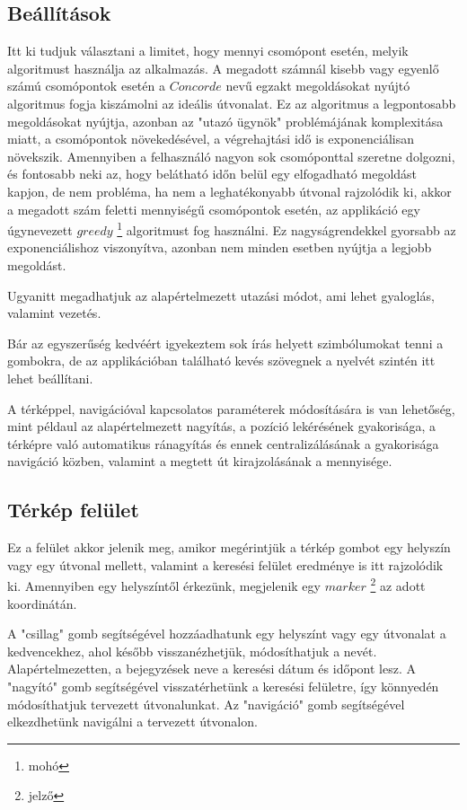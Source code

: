 \subsection{Beállítások}

Itt ki tudjuk választani a limitet, hogy mennyi csomópont esetén, melyik algoritmust használja az alkalmazás. A megadott számnál kisebb vagy egyenlő számú csomópontok esetén a \(Concorde\) nevű egzakt megoldásokat nyújtó algoritmus fogja kiszámolni az ideális útvonalat. Ez az algoritmus a legpontosabb megoldásokat nyújtja, azonban az "utazó ügynök" problémájának komplexitása miatt, a csomópontok növekedésével, a végrehajtási idő is exponenciálisan növekszik. Amennyiben a felhasználó nagyon sok csomóponttal szeretne dolgozni, és fontosabb neki az, hogy belátható időn belül egy elfogadható megoldást kapjon, de nem probléma, ha nem a leghatékonyabb útvonal rajzolódik ki, akkor a megadott szám feletti mennyiségű csomópontok esetén, az applikáció egy úgynevezett \(greedy\)%
\footnote{ %
	mohó
}  %
 algoritmust fog használni. Ez nagyságrendekkel gyorsabb az exponenciálishoz viszonyítva, azonban nem minden esetben nyújtja a legjobb megoldást.

Ugyanitt megadhatjuk az alapértelmezett utazási módot, ami lehet gyaloglás, valamint vezetés.

Bár az egyszerűség kedvéért igyekeztem sok írás helyett szimbólumokat tenni a gombokra, de az applikációban található kevés szövegnek a nyelvét szintén itt lehet beállítani.

A térképpel, navigációval kapcsolatos paraméterek módosítására is van lehetőség, mint példaul az alapértelmezett nagyítás, a pozíció lekérésének gyakorisága, a térképre való automatikus ránagyítás és ennek centralizálásának a gyakorisága navigáció közben, valamint a megtett út kirajzolásának a mennyisége.

\subsection{Térkép felület}

Ez a felület akkor jelenik meg, amikor megérintjük a térkép gombot egy helyszín vagy egy útvonal mellett, valamint a keresési felület eredménye is itt rajzolódik ki.
Amennyiben egy helyszíntől érkezünk, megjelenik egy \(marker\)%
\footnote{ %
	jelző
}  %
az adott koordinátán.

A "csillag" gomb segítségével hozzáadhatunk egy helyszínt vagy egy útvonalat a kedvencekhez, ahol később visszanézhetjük, módosíthatjuk a nevét. Alapértelmezetten, a bejegyzések neve a keresési dátum és időpont lesz. A "nagyító" gomb segítségével visszatérhetünk a keresési felületre, így könnyedén módosíthatjuk tervezett útvonalunkat. Az "navigáció" gomb segítségével elkezdhetünk navigálni a tervezett útvonalon.


